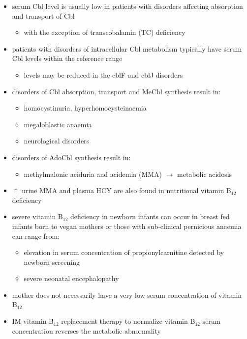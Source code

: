 \documentclass{scrartcl}
\begin{document}
\begin{itemize}
\item serum Cbl level is usually low in patients with disorders affecting
absorption and transport of Cbl
\begin{itemize}
\item with the exception of transcobalamin (TC) deficiency
\end{itemize}
\item patients with disorders of intracellular Cbl metabolism typically
have serum Cbl levels within the reference range
\begin{itemize}
\item levels may be reduced in the cblF and cblJ disorders
\end{itemize}
\item disorders of Cbl absorption, transport and MeCbl synthesis result in:
\begin{itemize}
\item homocystinuria, hyperhomocysteinaemia
\item megaloblastic anaemia
\item neurological disorders
\end{itemize}
\item disorders of AdoCbl synthesis result in:
\begin{itemize}
\item methylmalonic aciduria and acidemia (MMA) \(\to\) metabolic
acidosis
\end{itemize}
\item \(\uparrow\) urine MMA and plasma HCY are also found in nutritional
vitamin B\(_{\text{12}}\) deficiency
\item severe vitamin B\(_{\text{12}}\) deficiency in newborn infants can occur in
breast fed infants born to vegan mothers or those with sub-clinical
pernicious anaemia can range from:
\begin{itemize}
\item elevation in serum concentration of propionylcarnitine detected by
newborn screening
\item severe neonatal encephalopathy
\end{itemize}
\item mother does not necessarily have a very low serum concentration of
vitamin B\(_{\text{12}}\)
\item IM vitamin B\(_{\text{12}}\) replacement therapy to normalize vitamin B\(_{\text{12}}\) serum
concentration reverses the metabolic abnormality
\end{itemize}
\end{document}
